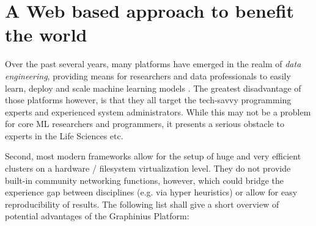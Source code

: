 \section{A Web based approach to benefit the world}
\label{sect:web_benefits}

Over the past several years, many platforms have emerged in the realm of \textit{data engineering}, providing means for researchers and data professionals to easily learn, deploy and scale machine learning models 
\cite{DataScienceTools2013}. The greatest disadvantage of those platforms however, is that they all target the tech-savvy programming experts and experienced system administrators. While this may not be a problem for core ML researchers and programmers, it presents a serious obstacle to experts in the Life Sciences etc.

Second, most modern frameworks allow for the setup of huge and very efficient clusters on a hardware / filesystem virtualization level. They do not provide built-in community networking functions, however, which could bridge the experience gap between disciplines (e.g. via hyper heuristics) or allow for easy reproducibility of results. The following list shall give a short overview of potential advantages of the Graphinius Platform:

